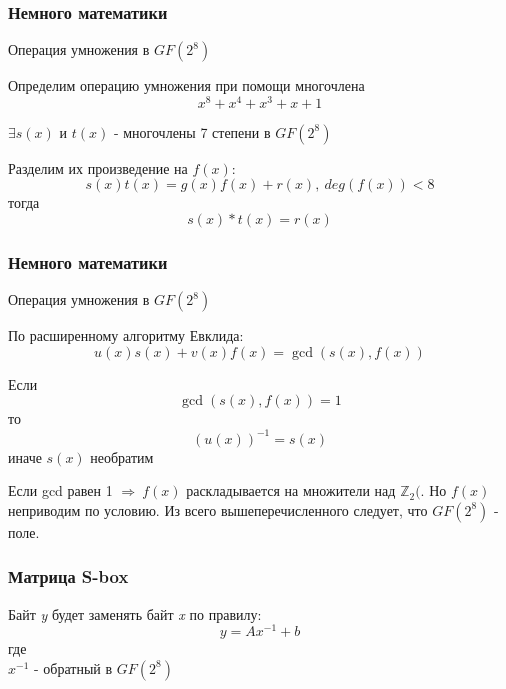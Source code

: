 \documentclass[10pt, typeface=serif(roman), pdf,hyperref={unicode}, aspectratio=169]{beamer}
\begin{document}
\begin{frame}
	\frametitle{Немного математики}
	\begin{block}
		{
			Операция умножения в \(GF(2^8)\)
		}
		\begin{description}
			\item Определим операцию умножения при помощи многочлена \[x^8+x^4+x^3+x+1\]
			\item \(\exists s(x)\) и \(t(x)\) - многочлены 7 степени в \(GF(2^8)\)
			\item Разделим их произведение на \(f(x)\): \[s(x)t(x)=g(x)f(x)+r(x), ~deg(f(x)) < 8\]
			тогда \[s(x)*t(x)=r(x)\]
		\end{description}
	\end{block}
\end{frame}



\begin{frame}
	\frametitle{Немного математики}
	\begin{block}
		{
			Операция умножения в \(GF(2^8)\)
		}
		\begin{description}
			\item По расширенному алгоритму Евклида: \[u(x)s(x)+v(x)f(x)= \gcd (s(x),f(x))\]
			\item Если \[\gcd (s(x),f(x)) = 1\] то \[(u(x))^{-1} = s(x)\]  иначе \(s(x)\) необратим
		\end{description}
	\end{block}
	Если gcd равен 1 \(\Rightarrow ~f(x)\) раскладывается на множители над \(\mathbb{Z}_2(\). Но \(f(x)\) неприводим по условию. Из всего вышеперечисленного следует, что \(GF(2^8)\) - поле.
\end{frame}



\begin{frame}
	\frametitle{Матрица S-box}
	Байт \textit{y} будет заменять байт \textit{x} по правилу:
	\[y = Ax^{-1}+b\] где\\
	\(x^{-1}\) - обратный в \(GF(2^8)\)
\end{frame}
\end{document}
